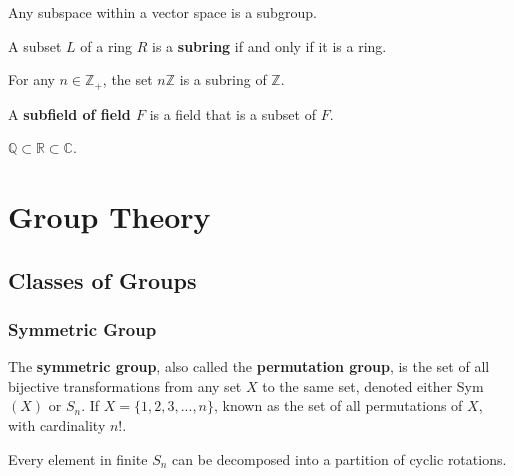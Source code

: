 \documentclass{article}
\begin{document}
    \begin{corollary}
      Any subspace within a vector space is a subgroup. 
    \end{corollary}

    \begin{definition}
      A subset $L$ of a ring $R$ is a \textbf{subring} if and only if it is a ring. 
    \end{definition}

    \begin{example}
      For any $n \in \mathbb{Z}_{+}$, the set $n\mathbb{Z}$ is a subring of $\mathbb{Z}$. 
    \end{example}

    \begin{definition}
      A \textbf{subfield of field $F$} is a field that is a subset of $F$.
    \end{definition}

    \begin{example}
      $\mathbb{Q} \subset \mathbb{R} \subset \mathbb{C}$. 
    \end{example}

\section{Group Theory}

  \subsection{Classes of Groups}

    \subsubsection{Symmetric Group}

      \begin{definition}
        The \textbf{symmetric group}, also called the \textbf{permutation group}, is the set of all bijective transformations from any set $X$ to the same set, denoted either Sym$(X)$ or $S_n$. If $X = \{1, 2, 3 ,... , n\}$, known as the set of all permutations of $X$, with cardinality $n!$. 
      \end{definition}

      \begin{proposition}
        Every element in finite $S_{n}$ can be decomposed into a partition of cyclic rotations.
      \end{proposition}
\end{document}
